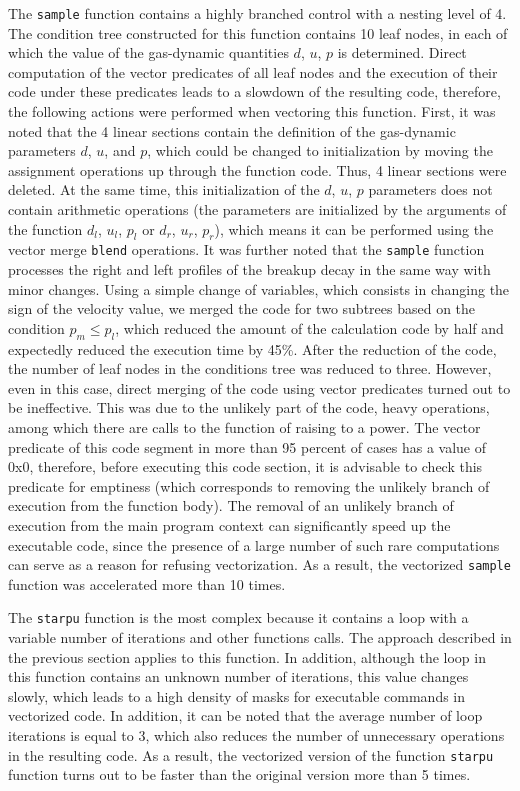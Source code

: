 \documentclass[
11pt,%
tightenlines,%
twoside,%
onecolumn,%
nofloats,%
nobibnotes,%
nofootinbib,%
superscriptaddress,%
noshowpacs,%
centertags]%
{revtex4}
\begin{document}
The \texttt{sample} function contains a highly branched control with a nesting level of 4.
The condition tree constructed for this function contains 10 leaf nodes, in each of which the value of the gas-dynamic quantities $d$, $u$, $p$ is determined.
Direct computation of the vector predicates of all leaf nodes and the execution of their code under these predicates leads to a slowdown of the resulting code, therefore, the following actions were performed when vectoring this function.
First, it was noted that the 4 linear sections contain the definition of the gas-dynamic parameters $d$, $u$, and $p$, which could be changed to initialization by moving the assignment operations up through the function code.
Thus, 4 linear sections were deleted.
At the same time, this initialization of the $d$, $u$, $p$ parameters does not contain arithmetic operations (the parameters are initialized by the arguments of the function $d_l$, $u_l$, $p_l$ or $d_r$, $u_r$, $p_r$), which means it can be performed using the vector merge \texttt{blend} operations.
It was further noted that the \texttt{sample} function processes the right and left profiles of the breakup decay in the same way with minor changes.
Using a simple change of variables, which consists in changing the sign of the velocity value, we merged the code for two subtrees based on the condition $p_m \le p_l$, which reduced the amount of the calculation code by half and expectedly reduced the execution time by 45\%.
After the reduction of the code, the number of leaf nodes in the conditions tree was reduced to three.
However, even in this case, direct merging of the code using vector predicates turned out to be ineffective.
This was due to the unlikely part of the code, heavy operations, among which there are calls to the function of raising to a power.
The vector predicate of this code segment in more than 95 percent of cases has a value of 0x0, therefore, before executing this code section, it is advisable to check this predicate for emptiness (which corresponds to removing the unlikely branch of execution from the function body).
The removal of an unlikely branch of execution from the main program context can significantly speed up the executable code, since the presence of a large number of such rare computations can serve as a reason for refusing vectorization.
As a result, the vectorized \texttt{sample} function was accelerated more than 10 times.

The \texttt{starpu} function is the most complex because it contains a loop with a variable number of iterations and other functions calls.
The approach described in the previous section applies to this function.
In addition, although the loop in this function contains an unknown number of iterations, this value changes slowly, which leads to a high density of masks for executable commands in vectorized code.
In addition, it can be noted that the average number of loop iterations is equal to 3, which also reduces the number of unnecessary operations in the resulting code.
As a result, the vectorized version of the function \texttt{starpu} function turns out to be faster than the original version more than 5 times.
\end{document}
